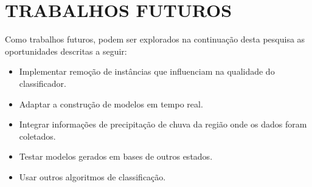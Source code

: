 \documentclass[
	12pt,				%
	openright,			%
	oneside,	
	a4paper,				%
	english,				%
	brazil				%
]{abntex2/abntex2} %
\begin{document}
	\section{TRABALHOS FUTUROS}
	
	Como trabalhos futuros, podem ser explorados na continuação desta pesquisa as oportunidades descritas a seguir:
	
	\begin{itemize}
		\item Implementar remoção de instâncias que influenciam na qualidade do classificador.
		\item Adaptar a construção de modelos em tempo real.
		\item Integrar informações de precipitação de chuva da região onde os dados foram coletados.
		\item Testar modelos gerados em bases de outros estados.
		\item Usar outros algoritmos de classificação.
	\end{itemize}

\postextual
{}
%









\begin{anexosenv}



%

\end{anexosenv}
\end{document}

